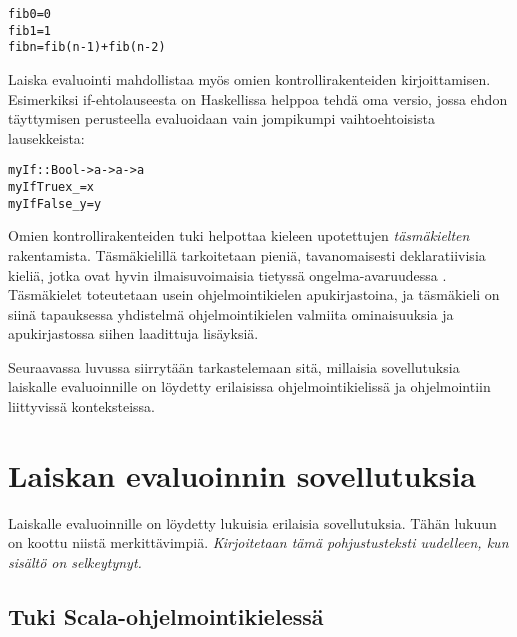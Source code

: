 \begin{alltt}
fib 0 = 0
fib 1 = 1
fib n = fib (n-1) + fib (n-2)
\end{alltt}

Laiska evaluointi mahdollistaa myös omien kontrollirakenteiden kirjoittamisen. Esimerkiksi if-ehtolauseesta on Haskellissa helppoa tehdä oma versio, jossa ehdon täyttymisen perusteella evaluoidaan vain jompikumpi vaihtoehtoisista lausekkeista:

\begin{alltt}
% Käyttö: myIf condition onTrue onFalse
myIf :: Bool -> a -> a -> a
myIf True  x _ = x
myIf False _ y = y
\end{alltt}

Omien kontrollirakenteiden tuki helpottaa kieleen upotettujen \textit{täsmäkielten} rakentamista. Täsmäkielillä tarkoitetaan pieniä, tavanomaisesti deklaratiivisia kieliä, jotka ovat hyvin ilmaisuvoimaisia tietyssä ongelma-avaruudessa \citep{van2000domain}. Täsmäkielet toteutetaan usein ohjelmointikielen apukirjastoina, ja täsmäkieli on siinä tapauksessa yhdistelmä ohjelmointikielen valmiita ominaisuuksia ja apukirjastossa siihen laadittuja lisäyksiä.

Seuraavassa luvussa siirrytään tarkastelemaan sitä, millaisia sovellutuksia laiskalle evaluoinnille on löydetty erilaisissa ohjelmointikielissä ja ohjelmointiin liittyvissä \mbox{konteksteissa.}


\section{Laiskan evaluoinnin sovellutuksia}


Laiskalle evaluoinnille on löydetty lukuisia erilaisia sovellutuksia. Tähän lukuun on koottu niistä merkittävimpiä. \textit{Kirjoitetaan tämä pohjustusteksti uudelleen, kun sisältö on selkeytynyt.}

\subsection{Tuki Scala-ohjelmointikielessä}

